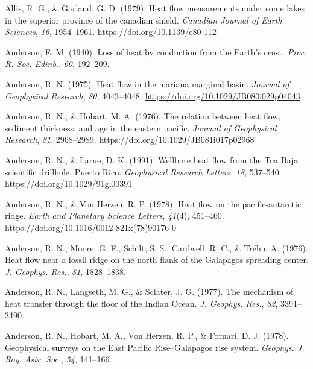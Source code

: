 \begin{CSLReferences}{1}{1}
\leavevmode{}%
Allis, R. G., \& Garland, G. D. (1979). Heat flow measurements under some lakes in the superior province of the canadian shield. \emph{Canadian Journal of Earth Sciences}, \emph{16}, 1954--1961. \url{https://doi.org/10.1139/e80-112}

\leavevmode{}%
Anderson, E. M. (1940). Loss of heat by conduction from the {Earth's} crust. \emph{Proc. R. Soc. Edinb.}, \emph{60}, 192--209.

\leavevmode{}%
Anderson, R. N. (1975). Heat flow in the mariana marginal basin. \emph{Journal of Geophysical Research}, \emph{80}, 4043--4048. \url{https://doi.org/10.1029/JB080i029p04043}

\leavevmode{}%
Anderson, R. N., \& Hobart, M. A. (1976). The relation between heat flow, sediment thickness, and age in the eastern pacific. \emph{Journal of Geophysical Research}, \emph{81}, 2968--2989. \url{https://doi.org/10.1029/JB081i017p02968}

\leavevmode{}%
Anderson, R. N., \& Larue, D. K. (1991). Wellbore heat flow from the {Toa Baja} scientific drillhole, {Puerto Rico}. \emph{Geophysical Research Letters}, \emph{18}, 537--540. \url{https://doi.org/10.1029/91gl00391}

\leavevmode{}%
Anderson, R. N., \& Von Herzen, R. P. (1978). Heat flow on the pacific-antarctic ridge. \emph{Earth and Planetary Science Letters}, \emph{41}(4), 451--460. \url{https://doi.org/10.1016/0012-821x(78)90176-0}

\leavevmode{}%
Anderson, R. N., Moore, G. F., Schilt, S. S., Cardwell, R. C., \& Tréhu, A. (1976). Heat flow near a fossil ridge on the north flank of the {Galapagos} spreading center. \emph{J. Geophys. Res.}, \emph{81}, 1828--1838.

\leavevmode{}%
Anderson, R. N., Langseth, M. G., \& Sclater, J. G. (1977). The mechanism of heat transfer through the floor of the {Indian Ocean}. \emph{J. Geophys. Res.}, \emph{82}, 3391--3490.

\leavevmode{}%
Anderson, R. N., Hobart, M. A., Von Herzen, R. P., \& Fornari, D. J. (1978). Geophysical surveys on the {East Pacific Rise--Galapagos} rise system. \emph{Geophys. J. Roy. Astr. Soc.}, \emph{54}, 141--166.


\end{CSLReferences}
